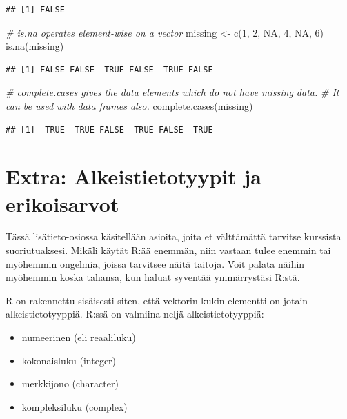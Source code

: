 \documentclass[
]{book}
\newenvironment{Shaded}{\begin{snugshade}}{\end{snugshade}}
\newcommand{\CommentTok}[1]{\textcolor[rgb]{0.56,0.35,0.01}{\textit{#1}}}
\newcommand{\ConstantTok}[1]{\textcolor[rgb]{0.00,0.00,0.00}{#1}}
\newcommand{\DecValTok}[1]{\textcolor[rgb]{0.00,0.00,0.81}{#1}}
\newcommand{\FunctionTok}[1]{\textcolor[rgb]{0.00,0.00,0.00}{#1}}
\newcommand{\NormalTok}[1]{#1}
\newcommand{\OtherTok}[1]{\textcolor[rgb]{0.56,0.35,0.01}{#1}}
\providecommand{\tightlist}{%
  \setlength{\itemsep}{0pt}\setlength{\parskip}{0pt}}
\begin{document}
\begin{verbatim}
## [1] FALSE
\end{verbatim}

\begin{Shaded}
\begin{Highlighting}[]
\CommentTok{\# is.na operates element{-}wise on a vector}
\NormalTok{missing }\OtherTok{\textless{}{-}} \FunctionTok{c}\NormalTok{(}\DecValTok{1}\NormalTok{, }\DecValTok{2}\NormalTok{, }\ConstantTok{NA}\NormalTok{, }\DecValTok{4}\NormalTok{, }\ConstantTok{NA}\NormalTok{, }\DecValTok{6}\NormalTok{)}
\FunctionTok{is.na}\NormalTok{(missing)}
\end{Highlighting}
\end{Shaded}

\begin{verbatim}
## [1] FALSE FALSE  TRUE FALSE  TRUE FALSE
\end{verbatim}

\begin{Shaded}
\begin{Highlighting}[]
\CommentTok{\# complete.cases gives the data elements which do not have missing data. }
\CommentTok{\# It can be used with data frames also.}
\FunctionTok{complete.cases}\NormalTok{(missing)}
\end{Highlighting}
\end{Shaded}

\begin{verbatim}
## [1]  TRUE  TRUE FALSE  TRUE FALSE  TRUE
\end{verbatim}

\hypertarget{extra}{%
\section{Extra: Alkeistietotyypit ja erikoisarvot}\label{extra}}

Tässä lisätieto-osiossa käsitellään asioita, joita et välttämättä tarvitse kurssista suoriutuaksesi. Mikäli käytät R:ää enemmän, niin vastaan tulee enemmin tai myöhemmin ongelmia, joissa tarvitsee näitä taitoja. Voit palata näihin myöhemmin koska tahansa, kun haluat syventää ymmärrystäsi R:stä.

R on rakennettu sisäisesti siten, että vektorin kukin elementti on jotain alkeistietotyyppiä. R:ssä on valmiina neljä alkeistietotyyppiä:

\begin{itemize}
\tightlist
\item
  numeerinen (eli reaaliluku)
\item
  kokonaisluku (integer)
\item
  merkkijono (character)
\item
  kompleksiluku (complex)
\end{itemize}
\end{document}
